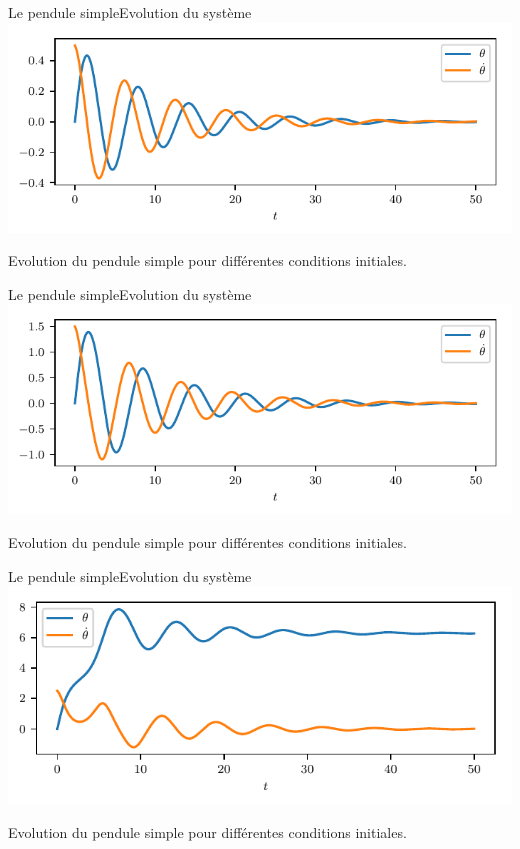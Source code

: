 \documentclass[usenames,dvipsnames,svgnames,10pt,aspectratio=169]{beamer}
\begin{document}
\begin{frame}[t, c]{Le pendule simple}{Evolution du système}
	\centering
	\includegraphics[width=.75\textwidth]{pendulum_fixed_trajectories_0}

	Evolution du pendule simple pour différentes conditions initiales.
	\vspace{1cm}
\end{frame}

\begin{frame}[t, c]{Le pendule simple}{Evolution du système}
	\centering
	\includegraphics[width=.75\textwidth]{pendulum_fixed_trajectories_2}

	Evolution du pendule simple pour différentes conditions initiales.
	\vspace{1cm}
\end{frame}


\begin{frame}[t, c]{Le pendule simple}{Evolution du système}
	\centering
	\includegraphics[width=.75\textwidth]{pendulum_fixed_trajectories_4}

	Evolution du pendule simple pour différentes conditions initiales.
	\vspace{1cm}
\end{frame}
\end{document}
